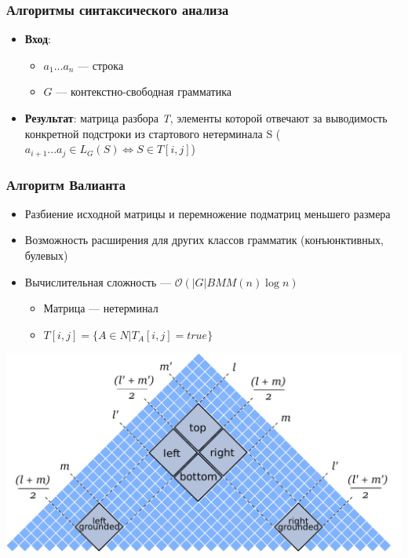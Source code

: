 \documentclass{beamer}
\begin{document}
\begin{frame}
  \transwipe[direction=90]
  \frametitle{Алгоритмы синтаксического анализа}
    \begin{itemize}
    \item \textbf{Вход}:
    \begin{itemize}
    	\item $a_1...a_n$ --- строка
    	\item $G$ --- контекстно-свободная грамматика
    \end{itemize} 
    \item \textbf{Результат}: матрица разбора \textit{T}, элементы которой отвечают за выводимость конкретной подстроки из стартового нетерминала S ($a_{i+1}...a_{j} \in L_{G}(S) \Leftrightarrow S \in T[i,j]$)
    
    \end{itemize}
\end{frame}
            
\begin{frame}[fragile]
\transwipe[direction=90]
\frametitle{Алгоритм Валианта}
\begin{itemize}
\item Разбиение исходной матрицы и перемножение подматриц меньшего размера
\item Возможность расширения для других классов грамматик (конъюнктивных, булевых) 
\item Вычислительная сложность --- $\mathcal{O}(|G|BMM(n)\log{}n)$
    \begin{itemize}
        \item Матрица --- нетерминал
        \item $T[i,j] = \{ A \in N | T_A[i,j] = true\}$
    \end{itemize}
\end{itemize}

\begin{center}
\vskip-20pt
\hfill
\includegraphics[width=.50\textwidth]{pictures/splitting_with_grounded.pdf}
\end{center}

\end{frame}
\end{document}
